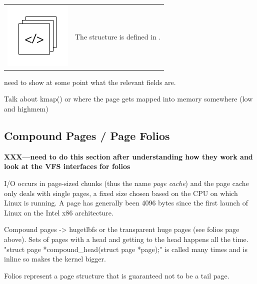 \begin{table}[h]
\begin{tabular}{ll}
\parbox[l]{0.6in}{\includegraphics[scale=0.8]{figures/src-xref.pdf}} & \parbox[l]{4in}{\small{The  structure is defined in .}}
\end{tabular}
\end{table}

\noindent
need to show at some point what the relevant fields are.

Talk about kmap() or where the page gets mapped into memory somewhere (low and highmem)


\subsection{Compound Pages / Page Folios}

\textbf{XXX---need to do this section after understanding how they work and look at the VFS interfaces for folios}


I/O occurs in page-sized chunks (thus the name \textit{page cache}) and the page cache only deals with single pages, a fixed size chosen based on the CPU on which Linux is running. A page has generally been 4096 bytes since the first launch of Linux on the Intel x86 architecture.

Compound pages -> hugetlbfs or the transparent huge pages (see folios page above). Sets of pages with a head and getting to the head happens all the time. "struct page *compound\_head(struct page *page);" is called many times and is inline so makes the kernel bigger.

Folios represent a page structure that is guaranteed not to be a tail page. 

